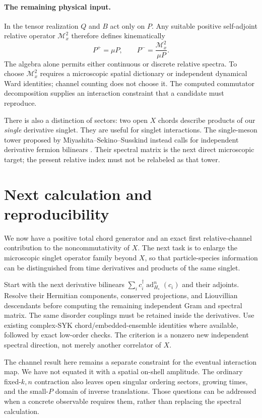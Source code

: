 \documentclass[11pt,a4paper]{article}
\begin{document}
\paragraph{The remaining physical input.}
In the tensor realization $Q$ and $B$ act only on $P$. Any suitable
positive self-adjoint relative operator $\mathcal M_x^2$ therefore
defines kinematically
\begin{equation}
 P^+=\mu P,\qquad P^-=\frac{\mathcal M_x^2}{\mu P}.
\end{equation}
The algebra alone permits either continuous or discrete relative
spectra. To choose $\mathcal M_x^2$ requires a microscopic spatial
dictionary or independent dynamical Ward identities; channel counting
does not choose it. The computed commutator decomposition supplies an
interaction constraint that a candidate must reproduce.

There is also a distinction of sectors: two open $X$ chords describe
products of our \emph{single} derivative singlet. They are useful for
singlet interactions. The single-meson tower proposed by
Miyashita--Sekino--Susskind instead calls for independent derivative
fermion bilinears \cite{MSS}. Their spectral matrix is the next
direct microscopic target; the present relative index must not be
relabeled as that tower.

\newpage
\section{Next calculation and reproducibility}
We now have a positive total chord generator and an exact first
relative-channel contribution to the noncommutativity of $X$.
The next task is to enlarge the microscopic singlet operator family
beyond $X$, so that particle-species information can be distinguished
from time derivatives and products of the same singlet.

Start with the next derivative bilinears
$\sum_i c_i^\dagger\operatorname{ad}_{H_s}^{n}(c_i)$ and their
adjoints. Resolve their Hermitian components, conserved projections,
and Liouvillian descendants before computing the remaining independent
Gram and spectral matrix. The same disorder couplings must be retained
inside the derivatives. Use existing complex-SYK chord/embedded-ensemble
identities where available, followed by exact low-order checks. The
criterion is a nonzero new independent spectral direction, not merely
another correlator of $X$.

The channel result here remains a separate constraint for the eventual
interaction map. We have not equated it with a spatial on-shell
amplitude. The ordinary fixed-$k,n$ contraction also leaves open
singular ordering sectors, growing times, and the small-$P$ domain of
inverse translations. Those questions can be addressed when a concrete
observable requires them, rather than replacing the spectral calculation.
\end{document}
